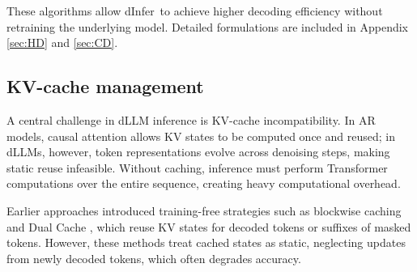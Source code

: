 \documentclass[]{antgroup}
\newcommand{\sys}{dInfer}
\begin{document}
These algorithms allow \sys~to achieve higher decoding efficiency without retraining the underlying model. Detailed formulations are included in Appendix \ref{sec:HD} and \ref{sec:CD}.

\subsection{KV-cache management} \label{sec:kvcache}

A central challenge in dLLM inference is KV-cache incompatibility. In AR models, causal attention allows KV states to be computed once and reused; in dLLMs, however, token representations evolve across denoising steps, making static reuse infeasible. Without caching, inference must perform Transformer computations over the entire sequence, creating heavy computational overhead.


Earlier approaches introduced training-free strategies such as blockwise caching and Dual Cache \citep{wu2025fast}, which reuse KV states for decoded tokens or suffixes of masked tokens. However, these methods treat cached states as static, neglecting updates from newly decoded tokens, which often degrades accuracy.

\end{document}

